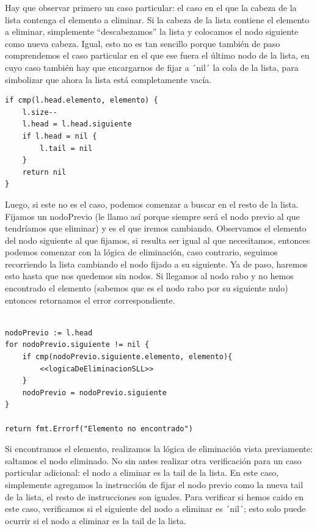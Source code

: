 \documentclass[11pt]{article}
\begin{document}
\begin{enumerate}
Hay que observar primero un caso particular: el caso en el que la cabeza de la lista contenga el elemento a eliminar. Si la cabeza de la lista contiene el elemento a eliminar, simplemente ``descabezamos'' la lista y colocamos el nodo siguiente como nueva cabeza. Igual, esto no es tan sencillo porque también de paso comprendemos el caso particular en el que ese fuera el último nodo de la lista, en cuyo caso también hay que encargarnos de fijar a ´nil´ la cola de la lista, para simbolizar que ahora la lista está completamente vacía.

\begin{verbatim}
if cmp(l.head.elemento, elemento) {
	l.size--
	l.head = l.head.siguiente
	if l.head = nil {
		l.tail = nil
	}
	return nil
}
\end{verbatim}

Luego, si este no es el caso, podemos comenzar a buscar en el resto de la lista. Fijamos un nodoPrevio (le llamo así porque siempre será el nodo previo al que tendríamos que eliminar) y es el que iremos cambiando. Observamos el elemento del nodo siguiente al que fijamos, si resulta ser igual al que necesitamos, entonces podemos comenzar con la lógica de eliminación, caso contrario, seguimos recorriendo la lista cambiando el nodo fijado a su siguiente. Ya de paso, haremos esto hasta que nos quedemos sin nodos. Si llegamos al nodo rabo y no hemos encontrado el elemento (sabemos que es el nodo rabo por su siguiente nulo) entonces retornamos el error correspondiente.

\begin{verbatim}

nodoPrevio := l.head
for nodoPrevio.siguiente != nil {
	if cmp(nodoPrevio.siguiente.elemento, elemento){
		<<logicaDeEliminacionSLL>>
	}
	nodoPrevio = nodoPrevio.siguiente
}

return fmt.Errorf("Elemento no encontrado")

\end{verbatim}

Si encontramos el elemento, realizamos la lógica de eliminación vista previamente: saltamos el nodo eliminado. No sin antes realizar otra verificación para un caso particular adicional: el nodo a eliminar es la tail de la lista. En este caso, simplemente agregamos la instrucción de fijar el nodo previo como la nueva tail de la lista, el resto de instrucciones son iguales. Para verificar si hemos caido en este caso, verificamos si el siguiente del nodo a eliminar es ´nil´; esto solo puede ocurrir si el nodo a eliminar es la tail de la lista.


\end{enumerate}
\end{document}
